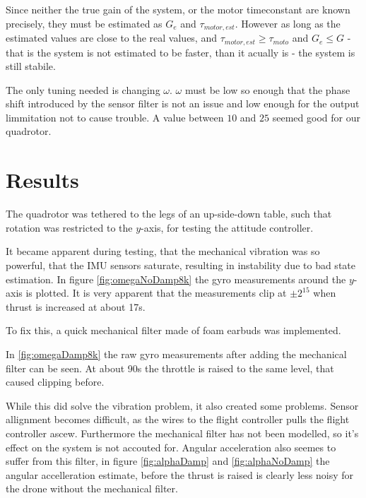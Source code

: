 
Since neither the true gain of the system, or the motor timeconstant are known
precisely, they must be estimated as $G_e$ and $\tau_{motor,est}$. However as long
as the estimated values are close to the real values, and $\tau_{motor,est} \geq
\tau_{moto}$ and $G_e \leq G$ - that is the system is not estimated to be
faster, than it acually is - the system is still stabile. %

The only tuning needed is changing $\omega$. $\omega$ must be low so enough that
the phase shift introduced by the sensor filter is not an issue and low enough
for the output limmitation not to cause trouble. A value between $10$ and $25$
seemed good for our quadrotor.

\section{ Results } %

The quadrotor was tethered to the legs of an up-side-down table, such that rotation
was restricted to the $y$-axis, for testing the attitude controller.

It became apparent during testing, that the mechanical vibration was so
powerful, that the IMU sensors saturate, resulting in instability due to bad
state estimation. In figure \ref{fig:omegaNoDamp8k} the gyro measurements
around the $y$-axis is plotted. It is very apparent that the measurements clip
at $\pm2^15$ when thrust is increased at about 17s.


To fix this, a quick mechanical filter made of foam earbuds was implemented.

In \ref{fig:omegaDamp8k} the raw gyro measurements after adding the mechanical filter
can be seen. At about 90s the throttle is raised to the same level, that caused
clipping before.


While this did solve the vibration problem, it also created some problems.
Sensor allignment becomes difficult, as the wires to the flight controller pulls the
flight controller ascew. Furthermore the mechanical filter has not been
modelled, so it's effect on the system is not accouted for.
Angular acceleration also seemes to suffer from this filter, in figure
\ref{fig:alphaDamp} and \ref{fig:alphaNoDamp} the angular accelleration
estimate, before the thrust is raised is clearly less noisy for the drone
without the mechanical filter.

